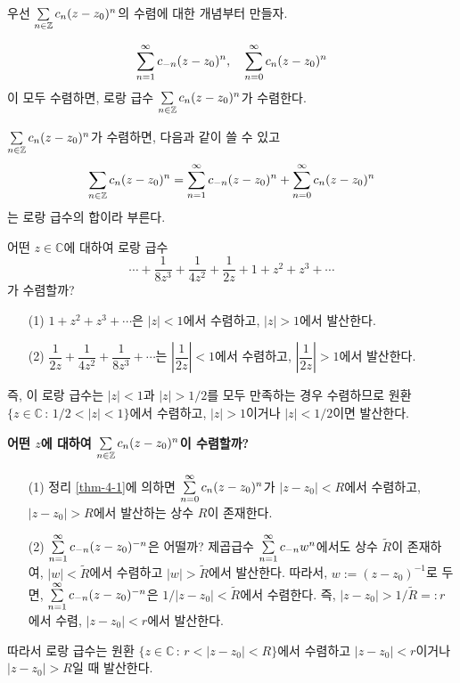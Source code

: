 우선 $\sum\limits_{n\in \mathbb Z} c_n(z-z_0)^n$의 수렴에 대한 개념부터 만들자.

\begin{saltdefinition}{}{} \label{def-4-3}
\[
\sum\limits_{n=1}^\infty c_{-n}(z-z_0)^n, \quad
\sum\limits_{n=0}^\infty c_{n}(z-z_0)^n
\]
이 모두 수렴하면, 
로랑 급수  $\sum\limits_{n\in \mathbb Z} c_n(z-z_0)^n$가 수렴한다.

$\sum\limits_{n\in \mathbb Z} c_n(z-z_0)^n$가 수렴하면, 다음과 같이 쓸 수 있고
\[
\sum\limits_{n\in \mathbb Z} c_n(z-z_0)^n
= \sum\limits_{n=1}^\infty c_{-n}(z-z_0)^n + \sum\limits_{n=0}^\infty c_{n}(z-z_0)^n
\]
는 로랑 급수의 합이라 부른다.
\end{saltdefinition}

\begin{saltexample}[label=example-4-10]{}{}
어떤 $z\in \mathbb C$에 대하여 로랑 급수
\[
\cdots + \dfrac1{8z^3} + \dfrac1{4z^2} + \dfrac1{2z} + 1 + z^2 + z^3 + \cdots
\]
가 수렴할까? 
\begin{itemize}
\item[(1)] $1 + z^2 + z^3 + \cdots$은 $|z|<1$에서 수렴하고, $|z|>1$에서 발산한다.
\item[(2)] $\dfrac1{2z} + \dfrac1{4z^2} +  \dfrac1{8z^3} + \cdots$는
$\left|\dfrac1{2z}\right|<1$에서 수렴하고, $\left|\dfrac1{2z}\right|>1$에서 발산한다.
\end{itemize}
즉, 이 로랑 급수는 $|z|<1$과 $|z|>1/2$를 모두 만족하는 경우 수렴하므로
원환 $\{ z\in \mathbb C\,:\, 1/2<|z|<1\}$에서 수렴하고,
$|z|>1$이거나 $|z|<1/2$이면 발산한다.
\end{saltexample}

{\bf 어떤 $z$에 대하여 $\sum\limits_{n\in \mathbb Z} c_n(z-z_0)^n$이 수렴할까?}

\begin{itemize}
\item[(1)] 정리 \ref{thm-4-1}에 의하면
$\sum\limits_{n=0}^\infty c_n(z-z_0)^n$가
$|z-z_0|<R$에서 수렴하고,  $|z-z_0|>R$에서 발산하는  상수 $R$이 존재한다.
\item[(2)] $\sum\limits_{n=1}^\infty c_{-n}(z-z_0)^{-n}$은 어떨까?
제곱급수 $\sum\limits_{n=1}^\infty c_{-n}w^n$에서도
상수 $\tilde R$이 존재하여,
 $|w|<\tilde R$에서 수렴하고
$|w|>\tilde R$에서 발산한다. 따라서,
$w:= (z-z_0)^{-1}$로 두면, $\sum\limits_{n=1}^\infty c_{-n}(z-z_0)^{-n}$은 
$1/|z-z_0| <\tilde R$에서 수렴한다. 즉, $|z-z_0|>1/\tilde R=:r$에서 수렴,
$|z-z_0|<r$에서 발산한다.
\end{itemize}

따라서 로랑 급수는 원환  $\{ z\in \mathbb C \,:\, r < |z-z_0| <R\}$에서 수렴하고
$|z-z_0|<r$이거나 $|z-z_0|>R$일 때 발산한다.

